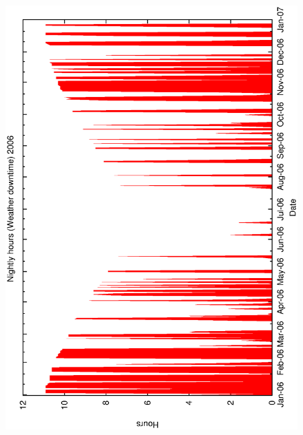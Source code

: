 {{\begin{figure}[htbp]
\begin{center}
{      \includegraphics[scale=0.3, angle=-90]{figures/ecs/met_nightly_stats_weather2006.eps}
      \label{fig:nightly_weather2006}
  } 
\end{center}
\end{figure}}}
